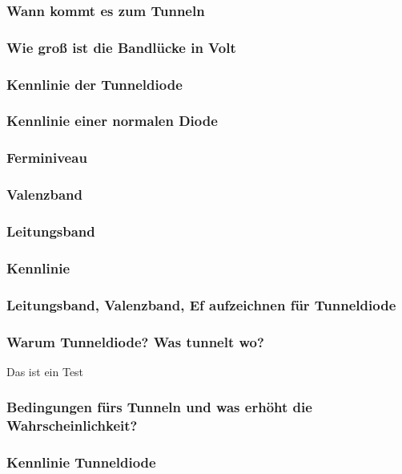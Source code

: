 \documentclass{article}
\begin{document}
    \subsubsection{Wann kommt es zum Tunneln}
    \subsubsection{Wie groß ist die Bandlücke in Volt}
    \subsubsection{Kennlinie der Tunneldiode}
    \subsubsection{Kennlinie einer normalen Diode}
    
    \subsubsection{Ferminiveau}
    \subsubsection{Valenzband}
    \subsubsection{Leitungsband}
    \subsubsection{Kennlinie}
    
    \subsubsection{Leitungsband, Valenzband, Ef aufzeichnen für Tunneldiode}

    \subsubsection{Warum Tunneldiode? Was tunnelt wo?}
Das ist ein Test
	
    \subsubsection{Bedingungen fürs Tunneln und was erhöht die Wahrscheinlichkeit?}
    \subsubsection{Kennlinie Tunneldiode}
\end{document}
